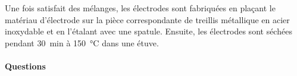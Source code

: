 \documentclass[twoside,a4paper,11pt,addpoints]{exam}%
\newcounter{foo} %
\begin{document}
Une fois satisfait des mélanges, les électrodes sont fabriquées en plaçant le matériau d'électrode sur la pièce correspondante de treillis métallique en acier inoxydable et en l'étalant avec une spatule. Ensuite, les électrodes sont séchées pendant \SI{30}{\minute} à \SI{150}{\celsius} dans une étuve.

\paragraph*{Questions}

\end{document}
